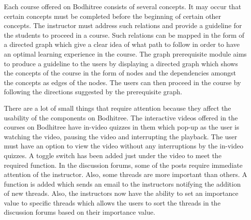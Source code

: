 \par Each course offered on Bodhitree consists of several concepts. It may occur that certain concepts must be completed before the beginning of certain other concepts. The instructor must address such relations and provide a guideline for the students to proceed in a course. Such relations can be mapped in the form of a directed graph which give a clear idea of what path to follow in order to have an optimal learning experience in the course. The graph prerequisite module aims to produce a guideline to the users by displaying a directed graph which shows the concepts of the course in the form of nodes and the dependencies amongst the concepts as edges of the nodes. The users can then proceed in the course by following the directions suggested by the prerequisite graph.

\par There are a lot of small things that require attention because they affect the usability of the components on Bodhitree. The interactive videos offered in the courses on Bodhitree have in-video quizzes in them which pop-up as the user is watching the video, pausing the video and interrupting the playback. The user must have an option to view the video without any interruptions by the in-video quizzes. A toggle switch has been added just under the video to meet the required function. In the discussion forums, some of the posts require immediate attention of the instructor. Also, some threads are more important than others. A function is added which sends an email to the instructors notifying the addition of new threads. Also, the instructors now have the ability to set an importance value to specific threads which allows the users to sort the threads in the discussion forums based on their importance value.